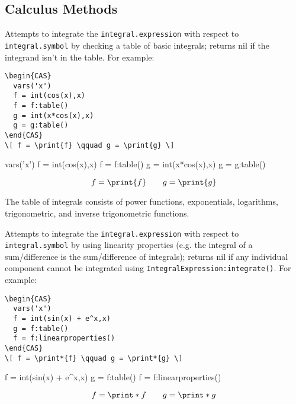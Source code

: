 \subsection{Calculus Methods}


Attempts to integrate the \texttt{integral.expression} with respect to \texttt{integral.symbol} by checking a table of basic integrals; returns nil if the integrand isn't in the table. For example:

\begin{codebox}
    \begin{verbatim}
\begin{CAS}
  vars('x')
  f = int(cos(x),x)
  f = f:table()
  g = int(x*cos(x),x)
  g = g:table()
\end{CAS}
\[ f = \print{f} \qquad g = \print{g} \] 
\end{verbatim}
\tcblower
\begin{CAS}
  vars('x')
  f = int(cos(x),x)
  f = f:table()
  g = int(x*cos(x),x)
  g = g:table()
  \end{CAS}
\[ f = \print{f} \qquad g = \print{g} \] 
\end{codebox}
The table of integrals consists of power functions, exponentials, logarithms, trigonometric, and inverse trigonometric functions. 


Attempts to integrate the \texttt{integral.expression} with respect to \texttt{integral.symbol} by using linearity properties (e.g. the integral of a sum/difference is the sum/difference of integrals); returns nil if any individual component cannot be integrated using \texttt{IntegralExpression:integrate()}. For example:

\begin{codebox}
    \begin{verbatim}
\begin{CAS}
  vars('x')
  f = int(sin(x) + e^x,x)
  g = f:table()
  f = f:linearproperties()
\end{CAS}
\[ f = \print*{f} \qquad g = \print*{g} \]
\end{verbatim}
\tcblower
\begin{CAS}
  f = int(sin(x) + e^x,x)
  g = f:table()
  f = f:linearproperties()
\end{CAS}
\[ f = \print*{f} \qquad g = \print*{g} \]
\end{codebox} 

